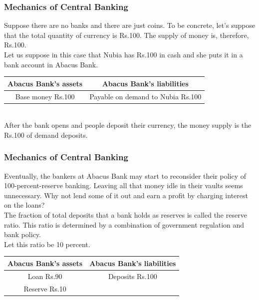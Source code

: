 \documentclass[shownotes,11pt, aspectratio=169]{beamer}
\begin{document}
\begin{frame}
\frametitle{Mechanics of Central Banking}
Suppose there are no banks and there are just coins.
To be concrete, let's suppose that the total quantity of currency is Rs.100. The supply of
money is, therefore, Rs.100. \\
\vspace{3mm}
Let us suppose in this case that Nubia has Rs.100 in cash and she puts it in a bank account in Abacus Bank. \\
\vspace{3mm}
\begin{tabular}{cc}
\hline
Abacus Bank's assets &	Abacus Bank's liabilities \\
\hline
Base money	Rs.100	& Payable on demand to Nubia	Rs.100 \\
\hline
\end{tabular}
\\
\vspace{3mm}
After the bank opens and people deposit their currency, the money supply
is the Rs.100 of demand deposits.
\end{frame}


\begin{frame}
\frametitle{Mechanics of Central Banking}
Eventually, the bankers at Abacus Bank may start to reconsider their policy
of 100-percent-reserve banking. Leaving all that money idle in their vaults seems
unnecessary. Why not lend some of it out and earn a profit by charging interest
on the loans? \\
\vspace{3mm}
The fraction of total deposits that a bank holds as reserves is called the reserve
ratio. This ratio is determined by a combination of government regulation and
bank policy.\\
\vspace{3mm}
Let this ratio be 10 percent. 
\pause
\\
\vspace{3mm}
\begin{tabular}{cc}
\hline
Abacus Bank's assets &	Abacus Bank's liabilities \\
\hline
Loan Rs.90	& Deposits	Rs.100 \\
Reserve Rs.10 & \\
\hline
\end{tabular}
\end{frame}
\end{document}
